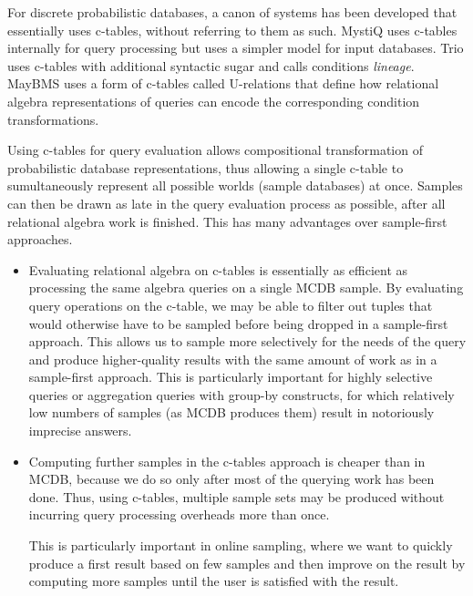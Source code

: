 For discrete probabilistic  databases, a canon of systems has been
developed that
essentially uses  c-tables, without referring to them as such.
MystiQ  \cite{dalvi07efficient}  uses  c-tables internally  for  query
processing  but  uses  a  simpler  model for  input  databases.   Trio
\cite{WidomTrio2008}  uses  c-tables with  additional  syntactic sugar  and
calls conditions {\em lineage}\/.  MayBMS
\cite{AJKO2008}  uses a  form of  c-tables called  U-relations that define
how relational algebra representations of queries can encode the corresponding condition
transformations.

Using
c-tables  for  query evaluation  allows  compositional  transformation of
 probabilistic  database representations, thus allowing a single c-table to sumultaneously represent  all
possible worlds  (sample databases) at once. Samples can then
be drawn as late in the query evaluation process as possible,  after all
relational algebra work is finished.
This has  many advantages over  sample-first
approaches.
\begin{itemize}
\addtolength{\topsep}{-0.3ex}
\addtolength{\labelsep}{-0.3ex}
\addtolength{\itemsep}{-1ex}
\item
Evaluating relational algebra on
c-tables is  essentially as efficient as processing  the same algebra
queries on a  single  MCDB  sample. By evaluating
query operations on  the c-table, we may be able  to filter out tuples
that would otherwise have to be  sampled before being dropped  in a
sample-first approach.  This
allows us  to sample more selectively  for the needs of  the query and
produce higher-quality results with  the same amount of work as
in a sample-first approach.
This  is particularly important for highly  selective queries or
aggregation queries with group-by constructs, for which relatively low
numbers   of   samples   (as   MCDB   produces   them) result in notoriously
imprecise answers.

\item
Computing further samples in the c-tables approach
is  cheaper than in  MCDB, because  we do  so only  after most  of the
querying  work  has been  done.   Thus,  using  c-tables, multiple sample sets
may be produced without incurring query processing overheads more than once.

This is particularly important in
online  sampling, where we want to  quickly produce  a first  result
based on few samples and then  improve on the result by computing more
samples until the user is satisfied with the result.
\end{itemize}


